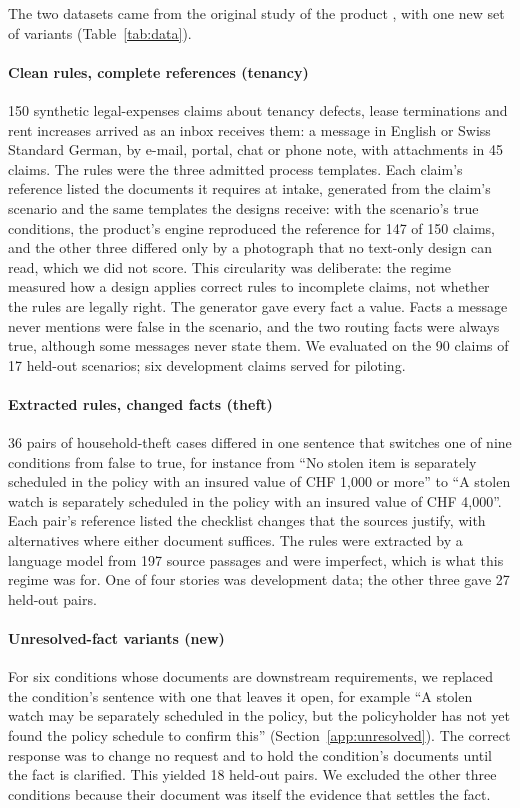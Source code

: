 The two datasets came from the original study of the product \cite{casepath2026repo}, with one new set of variants (Table~\ref{tab:data}).

\paragraph{Clean rules, complete references (tenancy)}
150 synthetic legal-expenses claims about tenancy defects, lease terminations and rent increases arrived as an inbox receives them: a message in English or Swiss Standard German, by e-mail, portal, chat or phone note, with attachments in 45 claims. The rules were the three admitted process templates. Each claim's reference listed the documents it requires at intake, generated from the claim's scenario and the same templates the designs receive: with the scenario's true conditions, the product's engine reproduced the reference for 147 of 150 claims, and the other three differed only by a photograph that no text-only design can read, which we did not score. This circularity was deliberate: the regime measured how a design applies correct rules to incomplete claims, not whether the rules are legally right. The generator gave every fact a value. Facts a message never mentions were false in the scenario, and the two routing facts were always true, although some messages never state them. We evaluated on the 90 claims of 17 held-out scenarios; six development claims served for piloting.

\paragraph{Extracted rules, changed facts (theft)}
36 pairs of household-theft cases differed in one sentence that switches one of nine conditions from false to true, for instance from ``No stolen item is separately scheduled in the policy with an insured value of CHF 1,000 or more'' to ``A stolen watch is separately scheduled in the policy with an insured value of CHF 4,000''. Each pair's reference listed the checklist changes that the sources justify, with alternatives where either document suffices. The rules were extracted by a language model from 197 source passages and were imperfect, which is what this regime was for. One of four stories was development data; the other three gave 27 held-out pairs.

\paragraph{Unresolved-fact variants (new)}
For six conditions whose documents are downstream requirements, we replaced the condition's sentence with one that leaves it open, for example ``A stolen watch may be separately scheduled in the policy, but the policyholder has not yet found the policy schedule to confirm this'' (Section~\ref{app:unresolved}). The correct response was to change no request and to hold the condition's documents until the fact is clarified. This yielded 18 held-out pairs. We excluded the other three conditions because their document was itself the evidence that settles the fact.

